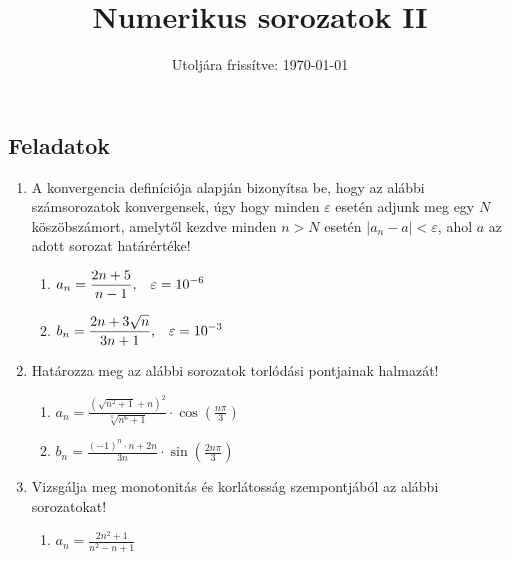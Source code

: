 \documentclass[a4paper, 12pt]{scrartcl}
\title{Numerikus sorozatok II}
\date{Utoljára frissítve: \today}
\begin{document}
\maketitle

\subsection{Feladatok}

\begin{enumerate}
  \item A konvergencia definíciója alapján bizonyítsa be, hogy az alábbi
        számsorozatok konvergensek, úgy hogy minden $\varepsilon$ esetén adjunk
        meg egy $N$ köszöbszámort, amelytől kezdve minden $n > N$ esetén
        $|a_n - a| < \varepsilon$, ahol $a$ az adott sorozat határértéke!
        \begin{enumerate}
          \item $\displaystyle
                  a_n = \frac{2n + 5}{n - 1}
                  \text,\quad
                  \varepsilon = 10^{-6}
                $

          \item $\displaystyle
                  b_n = \frac{2n + 3 \sqrt{n}}{3n + 1}
                  \text,\quad
                  \varepsilon = 10^{-3}
                $
        \end{enumerate}

  \item Határozza meg az alábbi sorozatok torlódási pontjainak halmazát!
        \begin{enumerate}
          \item $\displaystyle
                  a_n = \frac{\left(
                    \sqrt{n^2 + 1} + n
                    \right)^2}{
                    \sqrt[3]{n^6 + 1}
                  } \cdot \cos\left(
                  \frac{n\pi}{3}
                  \right)
                $

          \item $\displaystyle
                  b_n = \frac{(-1)^n \cdot n + 2n}{3n} \cdot \sin\left(
                  \frac{2n\pi}{3}
                  \right)
                $
        \end{enumerate}

  \item Vizsgálja meg monotonitás és korlátosság szempontjából az alábbi
        sorozatokat!
        \begin{enumerate}
          \item $\displaystyle
                  a_n = \frac{2n^2 + 1}{n^2 - n + 1}
                $


\end{enumerate}
\end{enumerate}
\end{document}
